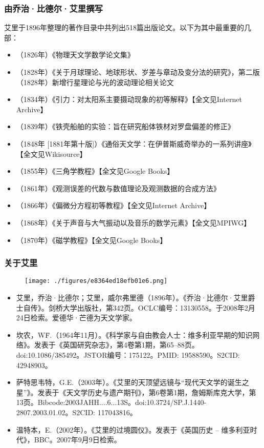 \subsubsection{由乔治·比德尔·艾里撰写}
艾里于1896年整理的著作目录中共列出518篇出版论文。以下为其中最重要的几部：
\begin{itemize}
\item （1826年）《物理天文学数学论文集》
\item （1828年）《关于月球理论、地球形状、岁差与章动及变分法的研究》，第二版（1828年）新增行星理论与光的波动理论相关论文
\item （1834年）《引力：对太阳系主要摄动现象的初等解释》【全文见Internet Archive】
\item （1839年）《铁壳船舶的实验：旨在研究船体铁材对罗盘偏差的修正》
\item （1848年 [1881年第十版]）《通俗天文学：在伊普斯威奇举办的一系列讲座》【全文见Wikisource】
\item （1855年）《三角学教程》【全文见Google Books】
\item （1861年）《观测误差的代数与数值理论及观测数据的合成方法》
\item （1866年）《偏微分方程初等教程》【全文见Internet Archive】
\item （1868年）《关于声音与大气振动以及音乐的数学元素》【全文见MPIWG】
\item （1870年）《磁学教程》【全文见Google Books】
\end{itemize}
\subsubsection{关于艾里}
\begin{figure}[ht]
\centering
\texttt{[image: ./figures/e8364ed18efb01e6.png]}
\caption{} \label{fig_AL_11}
\end{figure}
\begin{itemize}
\item 艾里，乔治·比德尔；艾里，威尔弗里德（1896年）。《乔治·比德尔·艾里爵士自传》。剑桥大学出版社，第342页。OCLC编号：13130558。于2008年2月24日检索。爱德华·芒德为天文学家。
\item 坎农，W\.F.（1964年11月）。《科学家与自由教会人士：维多利亚早期的知识网络》。发表于《英国研究杂志》，第4卷第1期，第65–88页。doi:10.1086/385492。JSTOR编号：175122。PMID: 19588590。S2CID: 42948903。
\item 萨特思韦特，G.E.（2003年）。《艾里的天顶望远镜与“现代天文学的诞生之星”》。发表于《天文学历史与遗产期刊》，第6卷第1期，詹姆斯库克大学，第13页。Bibcode:2003JAHH....6...13S。doi:10.3724/SP.J.1440-2807.2003.01.02。S2CID: 117043816。
\item 温特本，E.（2002年）。《艾里的过境圆仪》。发表于《英国历史 – 维多利亚时代》，BBC。2007年9月9日检索。
\end{itemize}
